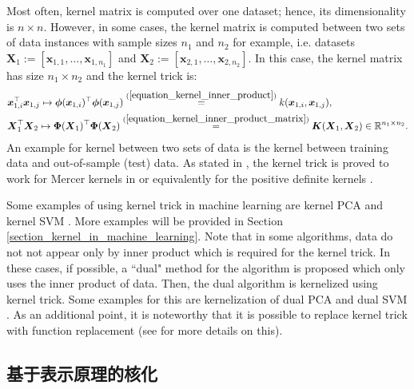 \documentclass[lang=cn,10pt]{gorgeousnbook}
\numberwithin{equation}{section}%
\numberwithin{figure}{section}%
\begin{document}
Most often, kernel matrix is computed over one dataset; hence, its dimensionality is $n \times n$. 
However, in some cases, the kernel matrix is computed between two sets of data instances with sample sizes $n_1$ and $n_2$ for example, i.e. datasets $\boldsymbol{X}_1 := [\boldsymbol{x}_{1,1}, \dots, \boldsymbol{x}_{1,n_1}]$ and $\boldsymbol{X}_2 := [\boldsymbol{x}_{2,1}, \dots, \boldsymbol{x}_{2,n_2}]$. In this case, the kernel matrix has size $n_1 \times n_2$ and the kernel trick is:
\begin{align}
&\boldsymbol{x}_{1,i}^\top \boldsymbol{x}_{1,j} \mapsto \boldsymbol{\phi}(\boldsymbol{x}_{1,i})^\top \boldsymbol{\phi}(\boldsymbol{x}_{1,j}) \overset{(\ref{equation_kernel_inner_product})}{=} k(\boldsymbol{x}_{1,i}, \boldsymbol{x}_{1,j}), \label{equation_kernel_trick_two_sets} \\
&\boldsymbol{X}_1^\top \boldsymbol{X}_2 \mapsto \boldsymbol{\Phi}(\boldsymbol{X}_1)^\top \boldsymbol{\Phi}(\boldsymbol{X}_2) \overset{(\ref{equation_kernel_inner_product_matrix})}{=} \boldsymbol{K}(\boldsymbol{X}_1, \boldsymbol{X}_2) \in \mathbb{R}^{n_1 \times n_2}.
\end{align}
An example for kernel between two sets of data is the kernel between training data and out-of-sample (test) data. 
As stated in \cite{scholkopf2001kernel}, the kernel trick is proved to work for Mercer kernels in \cite{boser1992training,vapnik1995nature} or equivalently for the positive definite kernels \cite{berg1984harmonic,wahba1990spline}.

Some examples of using kernel trick in machine learning are kernel PCA \cite{scholkopf1997kernel,scholkopf1998nonlinear,ghojogh2019unsupervised} and kernel SVM \cite{boser1992training,vapnik1995nature}.
More examples will be provided in Section \ref{section_kernel_in_machine_learning}.
Note that in some algorithms, data do not not appear only by inner product which is required for the kernel trick. In these cases, if possible, a ``dual" method for the algorithm is proposed which only uses the inner product of data. Then, the dual algorithm is kernelized using kernel trick. Some examples for this are kernelization of dual PCA \cite{ghojogh2019unsupervised} and dual SVM \cite{burges1998tutorial}. 
As an additional point, it is noteworthy that it is possible to replace kernel trick with function replacement (see \cite{ma2003function} for more details on this). 


\subsection{基于表示原理的核化}
\end{document}
